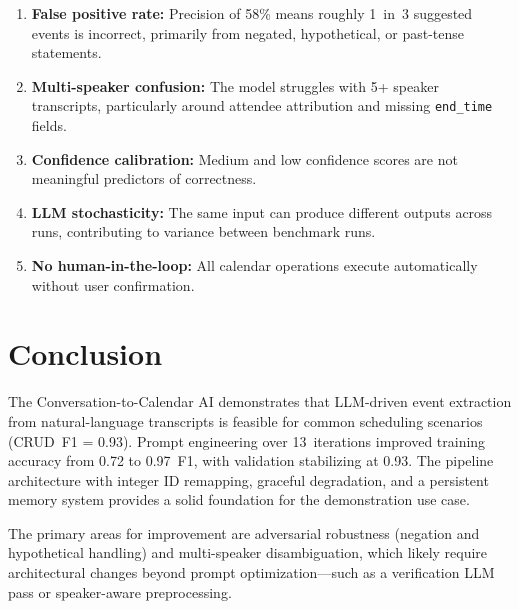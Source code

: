 \documentclass[12pt]{article}
\begin{document}
\begin{enumerate}
    \item \textbf{False positive rate:} Precision of 58\% means roughly
          1~in~3 suggested events is incorrect, primarily from negated,
          hypothetical, or past-tense statements.
    \item \textbf{Multi-speaker confusion:} The model struggles with
          5+ speaker transcripts, particularly around attendee attribution
          and missing \texttt{end\_time} fields.
    \item \textbf{Confidence calibration:} Medium and low confidence
          scores are not meaningful predictors of correctness.
    \item \textbf{LLM stochasticity:} The same input can produce different
          outputs across runs, contributing to variance between benchmark
          runs.
    \item \textbf{No human-in-the-loop:} All calendar operations execute
          automatically without user confirmation.
\end{enumerate}

\section{Conclusion}

The Conversation-to-Calendar AI demonstrates that LLM-driven event
extraction from natural-language transcripts is feasible for common
scheduling scenarios (CRUD~F1 = 0.93). Prompt engineering over
13~iterations improved training accuracy from 0.72 to 0.97~F1, with
validation stabilizing at 0.93. The pipeline architecture with integer
ID remapping, graceful degradation, and a persistent memory system
provides a solid foundation for the demonstration use case.

The primary areas for improvement are adversarial robustness (negation
and hypothetical handling) and multi-speaker disambiguation, which likely
require architectural changes beyond prompt optimization---such as a
verification LLM pass or speaker-aware preprocessing.
\end{document}
